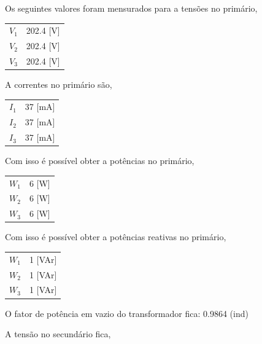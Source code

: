 \documentclass[paper=a4, fontsize=11pt]{article}
\begin{document}
Os seguintes valores foram mensurados para a tensões no primário,

\begin{center}
    \begin{tabular}{c||c}
        $V_1$ & 202.4 [V] \\
        $V_2$ & 202.4 [V] \\
        $V_3$ & 202.4 [V] \\
    \end{tabular}
\end{center}

A correntes no primário são,

\begin{center}
    \begin{tabular}{c||c}
        $I_1$ & 37 [mA] \\
        $I_2$ & 37 [mA] \\
        $I_3$ & 37 [mA] \\
    \end{tabular}
\end{center}

Com isso é possível obter a potências no primário,

\begin{center}
    \begin{tabular}{c||c}
        $W_1$ & 6 [W] \\
        $W_2$ & 6 [W] \\
        $W_3$ & 6 [W] \\
    \end{tabular}
\end{center}

Com isso é possível obter a potências reativas no primário,

\begin{center}
    \begin{tabular}{c||c}
        $W_1$ & 1 [VAr] \\
        $W_2$ & 1 [VAr] \\
        $W_3$ & 1 [VAr] \\
    \end{tabular}
\end{center}

O fator de potência em vazio do transformador fica: 0.9864 (ind)

A tensão no secundário fica,
\end{document}
